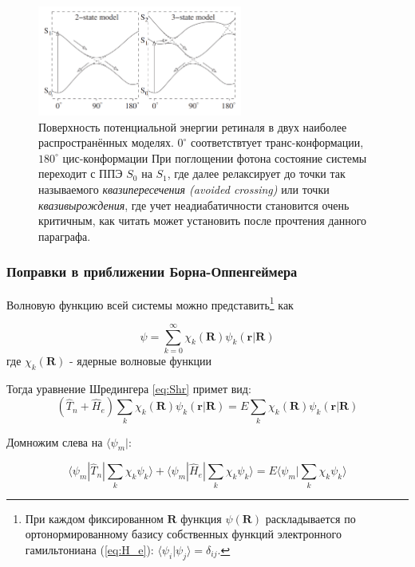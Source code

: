 \documentclass[12pt, oneside]{article}
\numberwithin{equation}{section}  %
\begin{document}
\begin{figure}[h] %
    \centering
    \includegraphics[width=0.6\textwidth]{./images/retinalePES.png}
    \caption{Поверхность потенциальной энергии ретиналя в двух наиболее распространённых моделях. \(0^{\circ}\) соответствтует транс-конформации, \(180^{\circ}\) цис-конформации При поглощении фотона состояние системы переходит с ППЭ \(S_0\) на \(S_1\), где далее релаксирует до точки так называемого \textit{квазипересечения (avoided crossing)} или точки \textit{квазивырождения}, где учет неадиабатичности становится очень критичным, как читать может установить после прочтения данного параграфа.}
    \label{fig:retinalePES}
\end{figure}

\subsubsection*{Поправки в приближении Борна-Оппенгеймера}

Волновую функцию всей системы можно представить\footnote{При каждом фиксированном \(\bm{R}\) функция \(\psi(\bm{R})\) раскладывается по ортонормированному базису собственных функций электронного гамильтониана (\ref{eq:H_e}): \(\langle \psi_i | \psi_j \rangle = \delta_{ij}\).} как 

\begin{equation}
    \psi = \sum_{k=0}^{\infty} \chi_k (\bm{R}) \psi_k (\bm{r}| \bm{R})
\end{equation}
где \(\chi_k(\bm{R})\) - ядерные волновые функции


Тогда уравнение Шредингера \ref{eq:Shr} примет вид:
\begin{equation}
(\hat{T}_n + \hat{H}_e) \sum_k \chi_k (\bm{R}) \psi_k (\bm{r}| \bm{R}) = E \sum_k \chi_k (\bm{R}) \psi_k (\bm{r}| \bm{R})
\end{equation}

Домножим слева на \(\langle \psi_m|\):

\begin{equation}
\langle \psi_m | \hat{T}_n | \sum_k \chi_k \psi_k \rangle + \langle \psi_m | \hat{H}_e | \sum_k \chi_k \psi_k \rangle = E \langle \psi_m | \sum_k \chi_k \psi_k \rangle
\end{equation}
\end{document}
